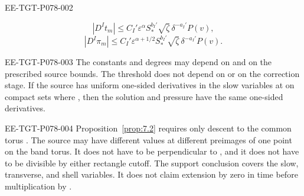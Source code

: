 \begin{proposition}
\begin{EESegment}{EE-TGT-P078-002}
\end{EESegment}
\begin{equation}
|D^It_m|\leq C_I'\varepsilon^\alpha S_*^{b_I'}\sqrt{\zeta}\,\delta^{-a_I'}P(v),
\tag{7.14}\label{eq:7.14}
\end{equation}
\begin{equation}
|D^I\pi_m|\leq C_I'\varepsilon^{\alpha+1/2}S_*^{b_I'}\sqrt{\zeta}\,\delta^{-a_I'}P(v).
\tag{7.15}\label{eq:7.15}
\end{equation}
\begin{EESegment}{EE-TGT-P078-003}
The constants and degrees may depend on  and on the prescribed source bounds. The threshold  does not depend on  or on the correction stage. If the source has uniform one-sided derivatives in the slow variables at  on compact sets where , then the solution and pressure have the same one-sided derivatives.
\end{EESegment}
\end{proposition}

\begin{EESegment}{EE-TGT-P078-004}
Proposition~\ref{prop:7.2} requires only descent to the common torus . The source may have different values at different preimages of one point on the band torus. It does not have to be perpendicular to , and it does not have to be divisible by either rectangle cutoff. The support conclusion covers the slow, transverse, and shell variables. It does not claim extension by zero in time before multiplication by .
\end{EESegment}

